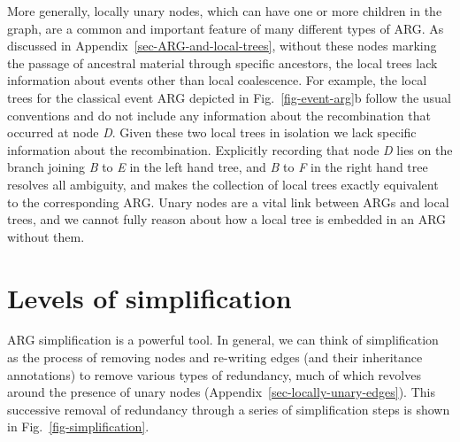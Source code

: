 \documentclass[9pt,twocolumn,twoside]{gsajnl}
\newcommand{\noderef}[1]{\textit{#1}}
\begin{document}
More generally, locally unary nodes,
which can have one or more children in the graph,
are a common and important feature
of many different types of ARG.
As discussed in Appendix~\ref{sec-ARG-and-local-trees},
without these nodes marking the passage
of ancestral material through specific ancestors, the local trees
lack information about events other than local coalescence.
For example, the local trees for the classical event ARG
depicted in Fig.~\ref{fig-event-arg}b follow the usual conventions
and do not include any information about the recombination
that occurred at node \noderef{D}. Given these two local trees
in isolation
we lack specific information about the recombination.
Explicitly recording that node \noderef{D} lies on the
branch joining \noderef{B} to \noderef{E} in the left hand
tree, and \noderef{B} to \noderef{F} in the right hand tree
resolves all ambiguity, and makes the collection of local
trees exactly equivalent to the corresponding ARG.
Unary nodes are a vital link between ARGs and local trees, and we
cannot fully reason about how a local tree is embedded in an ARG
without them.

\section{Levels of simplification}
\label{sec-ARG-simplification}
ARG simplification is a powerful tool.
In general, we can think of
simplification as the process
of removing nodes and re-writing edges (and their inheritance annotations)
to remove various types of redundancy, much of which
revolves around the presence of unary nodes (Appendix~\ref{sec-locally-unary-edges}).
This successive removal of redundancy
through a series of simplification steps is shown
in Fig.~\ref{fig-simplification}.
\end{document}
